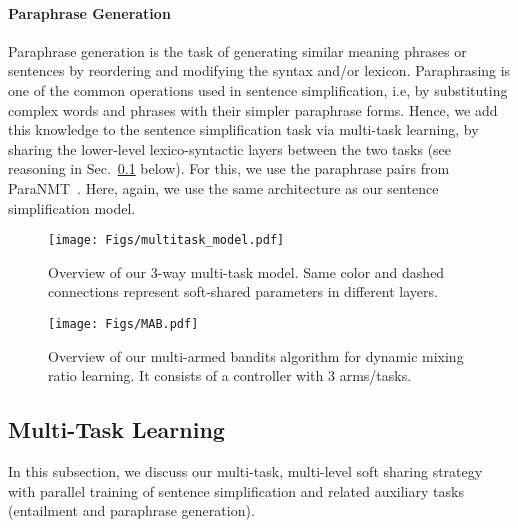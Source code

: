\documentclass[11pt]{article}
\begin{document}
\paragraph{Paraphrase Generation} 
Paraphrase generation is the task of generating similar meaning phrases or sentences by reordering and modifying the syntax and/or lexicon. Paraphrasing is one of the common operations used in sentence simplification, i.e, by substituting complex words and phrases with their simpler paraphrase forms. Hence, we add this knowledge to the sentence simplification task via multi-task learning, by sharing the lower-level lexico-syntactic layers between the two tasks (see reasoning in Sec.~\ref{subsec:multi-level-sharing-mechanism} below). For this, we use the paraphrase pairs from ParaNMT~\cite{Wieting2017PushingTL}. Here, again, we use the same architecture as our sentence simplification model.


\begin{figure}
\centering
\begin{minipage}[t]{.48\linewidth}
\centering
\texttt{[image: Figs/multitask\_model.pdf]}
\vspace{-10pt}
\caption{Overview of our 3-way multi-task model. Same color and dashed connections represent soft-shared parameters in different layers.
}
\vspace{-10pt}
\label{fig:multitask}
\end{minipage}
\hfill
\begin{minipage}[t]{.48\linewidth}
\centering
\texttt{[image: Figs/MAB.pdf]}
\vspace{-10pt}
\caption{Overview of our multi-armed bandits algorithm for dynamic mixing ratio learning. It consists of a controller with 3 arms/tasks.
}
\vspace{-10pt}
\label{fig:mab}
\end{minipage}
\end{figure}



\subsection{Multi-Task Learning}
\label{subsec:multi-level-sharing-mechanism}
In this subsection, we discuss our multi-task, multi-level soft sharing strategy with parallel training of sentence simplification and related auxiliary tasks (entailment and paraphrase generation). 
\end{document}

